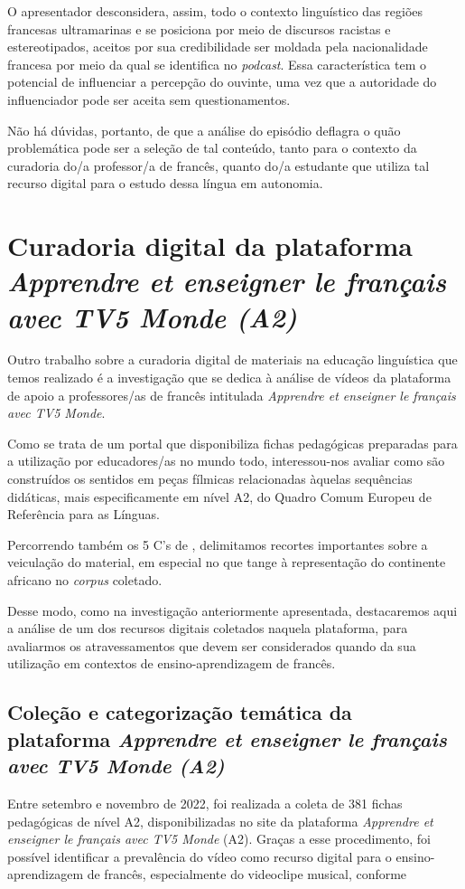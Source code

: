 \documentclass[portuguese]{textolivre}
\begin{document}
O apresentador desconsidera, assim, todo o contexto linguístico das regiões francesas ultramarinas e se posiciona por meio de discursos racistas e estereotipados, aceitos por sua credibilidade ser moldada pela nacionalidade francesa por meio da qual se identifica no \textit{podcast}. Essa característica tem o potencial de influenciar a percepção do ouvinte, uma vez que a autoridade do influenciador pode ser aceita sem questionamentos.

Não há dúvidas, portanto, de que a análise do episódio deflagra o quão problemática pode ser a seleção de tal conteúdo, tanto para o contexto da curadoria do/a professor/a de francês, quanto do/a estudante que utiliza tal recurso digital para o estudo dessa língua em autonomia. 

\section{Curadoria digital da plataforma \textit{Apprendre et enseigner le français avec TV5 Monde (A2)}}\label{sec-formato}
Outro trabalho sobre a curadoria digital de materiais na educação linguística que temos realizado é a investigação que se dedica à análise de vídeos da plataforma de apoio a professores/as de francês intitulada \textit{Apprendre et enseigner le français avec TV5 Monde}. 

Como se trata de um portal que disponibiliza fichas pedagógicas preparadas para a utilização por educadores/as no mundo todo, interessou-nos avaliar como são construídos os sentidos em peças fílmicas relacionadas àquelas sequências didáticas, mais especificamente em nível A2, do Quadro Comum Europeu de Referência para as Línguas.

Percorrendo também os 5 C’s de \textcite{deschaine_five_2015}, delimitamos recortes importantes sobre a veiculação do material, em especial no que tange à representação do continente africano no \textit{corpus} coletado. 

Desse modo, como na investigação anteriormente apresentada, destacaremos aqui a análise de um dos recursos digitais coletados naquela plataforma, para avaliarmos os atravessamentos que devem ser considerados quando da sua utilização em contextos de ensino-aprendizagem de francês.


\subsection{Coleção e categorização temática da plataforma \textit{Apprendre et enseigner le français avec TV5 Monde (A2)}}\label{sec-modelo}
Entre setembro e novembro de 2022, foi realizada a coleta de 381 fichas pedagógicas de nível A2, disponibilizadas no site da plataforma \textit{Apprendre et enseigner le français avec TV5 Monde} (A2). Graças a esse procedimento, foi possível identificar a prevalência do vídeo como recurso digital para o ensino-aprendizagem de francês, especialmente do videoclipe musical, conforme  
\end{document}
